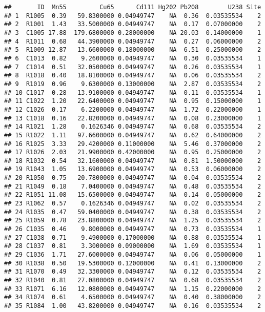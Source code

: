 \documentclass[]{article}
\begin{document}
\begin{verbatim}
##       ID  Mn55         Cu65      Cd111 Hg202 Pb208        U238 Site
## 1  R1005  0.39   59.8300000 0.04949747    NA  0.36  0.03535534    2
## 2  R1001  1.43   33.5000000 0.04949747    NA  0.17  0.07000000    2
## 3  C1005 17.88  179.6800000 0.28000000    NA 20.03  0.14000000    1
## 4  R1011  0.68   44.3900000 0.04949747    NA  0.27  0.06000000    2
## 5  R1009 12.87   13.6600000 0.18000000    NA  6.51  0.25000000    2
## 6  C1013  0.82    9.2600000 0.04949747    NA  0.30  0.03535534    1
## 7  C1014  0.51   32.0500000 0.04949747    NA  0.26  0.03535534    1
## 8  R1018  0.40   18.8100000 0.04949747    NA  0.06  0.03535534    2
## 9  R1019  0.96    9.6300000 0.13000000    NA  2.87  0.03535534    2
## 10 C1017  0.28   13.9100000 0.04949747    NA  0.11  0.03535534    1
## 11 C1022  1.20   22.6400000 0.04949747    NA  0.95  0.15000000    1
## 12 C1026  0.17    6.2200000 0.04949747    NA  1.72  0.22000000    1
## 13 C1018  0.16   22.8200000 0.04949747    NA  0.08  0.23000000    1
## 14 R1021  1.28    0.1626346 0.04949747    NA  0.68  0.03535534    2
## 15 R1022  1.11   97.6600000 0.04949747    NA  0.62  0.64000000    2
## 16 R1025  3.33   29.4200000 0.11000000    NA  5.46  0.37000000    2
## 17 R1026  2.03   21.9900000 0.42000000    NA  0.95  0.25000000    2
## 18 R1032  0.54   32.1600000 0.04949747    NA  0.81  1.50000000    2
## 19 R1043  1.05   13.6900000 0.04949747    NA  0.53  0.06000000    2
## 20 R1050  0.75   20.7800000 0.04949747    NA  0.04  0.03535534    2
## 21 R1049  0.18    7.0400000 0.04949747    NA  0.48  0.03535534    2
## 22 R1051 11.08   15.6500000 0.04949747    NA  0.14  0.05000000    2
## 23 R1062  0.57    0.1626346 0.04949747    NA  0.02  0.03535534    2
## 24 R1035  0.47   59.0400000 0.04949747    NA  0.38  0.03535534    2
## 25 R1059  0.78   23.8800000 0.04949747    NA  1.25  0.03535534    2
## 26 C1035  0.46    9.8000000 0.04949747    NA  0.73  0.03535534    1
## 27 C1038  0.71    9.4900000 0.17000000    NA  0.88  0.03535534    1
## 28 C1037  0.81    3.3000000 0.09000000    NA  1.69  0.03535534    1
## 29 C1036  1.71   27.6000000 0.04949747    NA  0.06  0.05000000    1
## 30 R1038  0.50   19.5300000 0.12000000    NA  0.41  0.13000000    2
## 31 R1070  0.49   32.3300000 0.04949747    NA  0.12  0.03535534    2
## 32 R1040  0.81   27.0800000 0.04949747    NA  0.68  0.03535534    2
## 33 R1071  6.16   12.0800000 0.04949747    NA  1.15  0.22000000    2
## 34 R1074  0.61    4.6500000 0.04949747    NA  0.40  0.38000000    2
## 35 R1084  1.00   43.8200000 0.04949747    NA  0.16  0.03535534    2

\end{verbatim}
\end{document}
